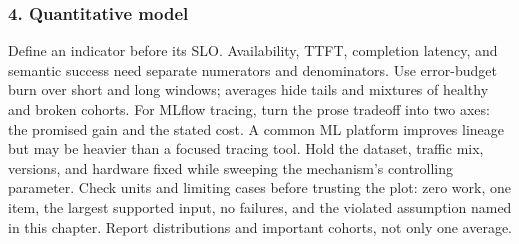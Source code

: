 \subsubsection*{4. Quantitative model}
Define an indicator before its SLO. Availability, TTFT, completion latency, and semantic success need separate numerators and denominators. Use error-budget burn over short and long windows; averages hide tails and mixtures of healthy and broken cohorts.
For MLflow tracing, turn the prose tradeoff into two axes: the promised gain and the stated cost. A common ML platform improves lineage but may be heavier than a focused tracing tool. Hold the dataset, traffic mix, versions, and hardware fixed while sweeping the mechanism's controlling parameter.
Check units and limiting cases before trusting the plot: zero work, one item, the largest supported input, no failures, and the violated assumption named in this chapter. Report distributions and important cohorts, not only one average.
